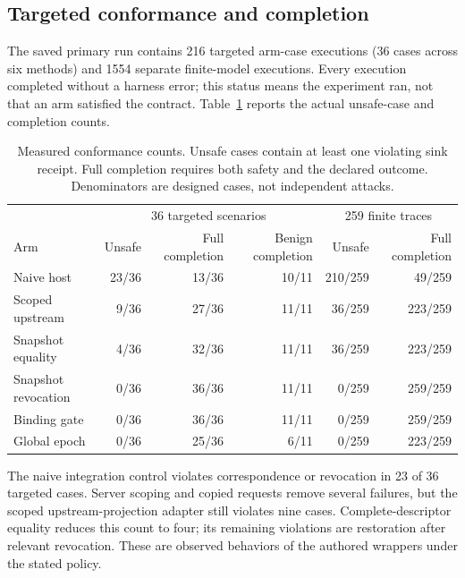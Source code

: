 \subsection{Targeted conformance and completion}

The saved primary run contains 216 targeted arm-case executions (36 cases across six methods) and 1554 separate finite-model executions. Every execution completed without a harness error; this status means the experiment ran, not that an arm satisfied the contract. Table~\ref{tab:outcomes} reports the actual unsafe-case and completion counts.

\begin{table}[t]\centering\small

\caption{Measured conformance counts. Unsafe cases contain at least one violating sink receipt. Full completion requires both safety and the declared outcome. Denominators are designed cases, not independent attacks.}\label{tab:outcomes}

\begin{tabular}{lrrrrr}\hline

& \multicolumn{3}{c}{36 targeted scenarios} & \multicolumn{2}{c}{259 finite traces} \\

Arm & Unsafe & Full completion & Benign completion & Unsafe & Full completion \\\hline

Naive host & 23/36 & 13/36 & 10/11 & 210/259 & 49/259 \\

Scoped upstream & 9/36 & 27/36 & 11/11 & 36/259 & 223/259 \\

Snapshot equality & 4/36 & 32/36 & 11/11 & 36/259 & 223/259 \\

Snapshot revocation & 0/36 & 36/36 & 11/11 & 0/259 & 259/259 \\

Binding gate & 0/36 & 36/36 & 11/11 & 0/259 & 259/259 \\

Global epoch & 0/36 & 25/36 & 6/11 & 0/259 & 223/259 \\

\hline\end{tabular}\end{table}

The naive integration control violates correspondence or revocation in 23 of 36 targeted cases. Server scoping and copied requests remove several failures, but the scoped upstream-projection adapter still violates nine cases. Complete-descriptor equality reduces this count to four; its remaining violations are restoration after relevant revocation. These are observed behaviors of the authored wrappers under the stated policy.

